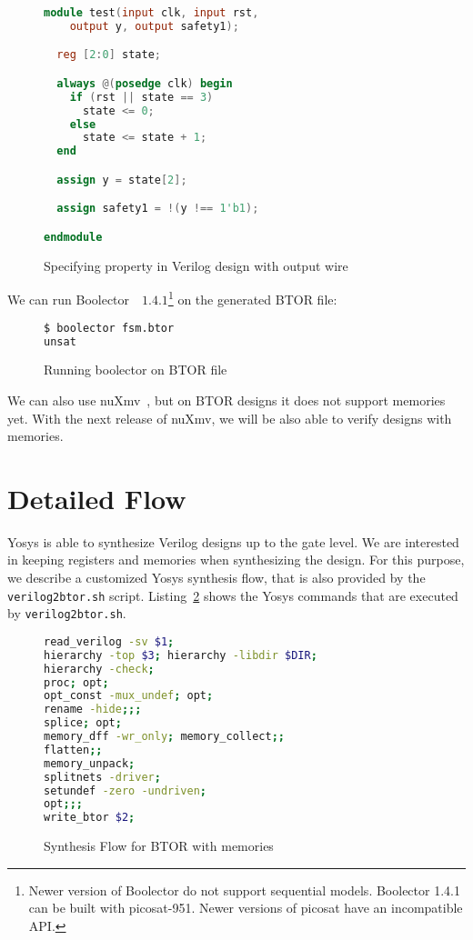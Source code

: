 \documentclass[9pt,technote,a4paper]{IEEEtran}
\begin{document}
\begin{figure}[H]
\begin{lstlisting}[language=Verilog,numbers=none]
module test(input clk, input rst,
    output y, output safety1);

  reg [2:0] state;

  always @(posedge clk) begin
    if (rst || state == 3)
      state <= 0;
    else
      state <= state + 1;
  end

  assign y = state[2];

  assign safety1 = !(y !== 1'b1);

endmodule
\end{lstlisting}
\renewcommand{\figurename}{Listing}
\caption{Specifying property in Verilog design with output wire}
\label{specifying_property_output}
\end{figure}

We can run Boolector~\cite{boolector}~$1.4.1$\footnote{
Newer version of Boolector do not support sequential models.
Boolector 1.4.1 can be built with picosat-951. Newer versions
of picosat have an incompatible API.} on the generated BTOR
file:

\begin{figure}[H]
\begin{lstlisting}[language=sh,numbers=none]
$ boolector fsm.btor 
unsat
\end{lstlisting}
 \renewcommand{\figurename}{Listing}
\caption{Running boolector on BTOR file}
\end{figure}

We can also use nuXmv~\cite{nuxmv}, but on BTOR designs it does not
support memories yet. With the next release of nuXmv, we will be also
able to verify designs with memories.

\section{Detailed Flow}

Yosys is able to synthesize Verilog designs up to the gate level.
We are interested in keeping registers and memories when synthesizing
the design. For this purpose, we describe a customized Yosys synthesis
flow, that is also provided by the {\tt verilog2btor.sh} script.
Listing~\ref{btor_script_memory} shows the Yosys commands that are
executed by {\tt verilog2btor.sh}.

\begin{figure}[H]
\begin{lstlisting}[language=sh]
read_verilog -sv $1; 
hierarchy -top $3; hierarchy -libdir $DIR; 
hierarchy -check; 
proc; opt; 
opt_const -mux_undef; opt;
rename -hide;;;
splice; opt;
memory_dff -wr_only; memory_collect;;
flatten;;
memory_unpack; 
splitnets -driver;
setundef -zero -undriven;
opt;;;
write_btor $2;
\end{lstlisting}
 \renewcommand{\figurename}{Listing}
\caption{Synthesis Flow for BTOR with memories}
\label{btor_script_memory}
\end{figure}
\end{document}
